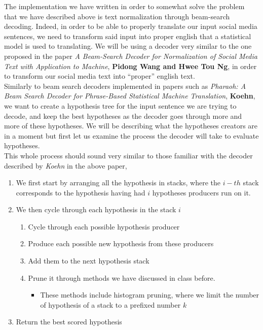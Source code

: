 \documentclass{article}
\begin{document}
The implementation we have written in order to somewhat solve the problem that we have described above is text normalization through beam-search decoding. Indeed, in order to be able to properly translate our input social media sentences, we need to transform said input into proper english that a statistical model is used to translating. We will be using a decoder very similar to the one proposed in the paper  \textit{A Beam-Search Decoder for Normalization of Social Media Text with Application to Machine}, \textbf{Pidong Wang and Hwee Tou Ng}, in order to transform our social media text into “proper” english text. \\

Similarly to beam search decoders implemented in papers such as \textit{Pharaoh: A Beam Search Decoder for Phrase-Based Statistical Machine Translation}, \textbf{Koehn}, we want to create a hypothesis tree for the input sentence we are trying to decode, and keep the best hypotheses as the decoder goes through more and more of these hypotheses. We will be describing what the hypotheses creators are in a moment but first let us examine the process the decoder will take to evaluate hypotheses. \\

This whole process should sound very similar to those familiar with the decoder described by \textit{Koehn} in the above paper, 
\begin{enumerate}
	\item We first start by arranging all the hypothesis in stacks, where the $i-th$ stack corresponds to the hypothesis having had $i$ hypotheses producers run on it. 
	\item We then cycle through each hypothesis in the stack $i$
	\begin{enumerate}
		\item Cycle through each possible hypothesis producer
		\item Produce each possible new hypothesis from these producers
		\item Add them to the next hypothesis stack 
		\item Prune it through methods we have discussed in class before.
		\begin{itemize}
			\item These methods include histogram pruning, where we limit the number of hypothesis of a stack to a prefixed number $k$
		\end{itemize}
	\end{enumerate}
	\item Return the best scored hypothesis
\end{enumerate}
\end{document}
